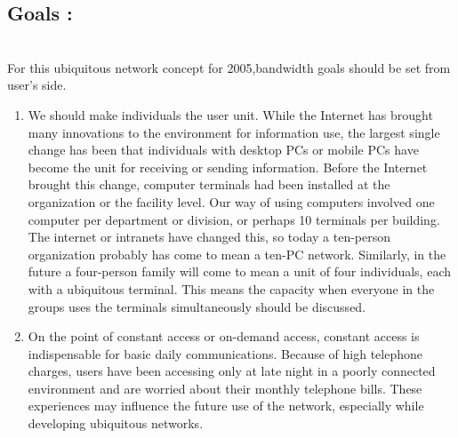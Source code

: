 \documentclass[12pt]{report}
\begin{document}
\subsection{Goals :}\\
\hspace*{0.5in}For this ubiquitous network concept for 2005,bandwidth goals should be set from user's side.\\
\begin{enumerate}
\item We should make individuals the user unit. While the Internet has brought many innovations to the environment for information use, the largest single change has been that individuals with desktop PCs or mobile PCs have become the unit for receiving or sending information. Before the Internet brought this change, computer terminals had been installed at the organization or the facility level. Our way of using computers involved one computer per department or division, or perhaps 10 terminals per building. The internet or intranets have changed this, so today a ten-person organization probably has come to mean a ten-PC network. Similarly, in the future a four-person family will come to mean a unit of four individuals, each with a ubiquitous terminal. This means the capacity when everyone in the groups uses the terminals simultaneously should be discussed.
\item  On the point of constant access or on-demand access, constant access is indispensable for basic daily communications. Because of high telephone charges, users have been accessing only at late night in a poorly connected environment and are worried about their monthly telephone bills. These experiences may influence the future use of the network, especially while developing ubiquitous networks.

\end{enumerate}
\end{document}

